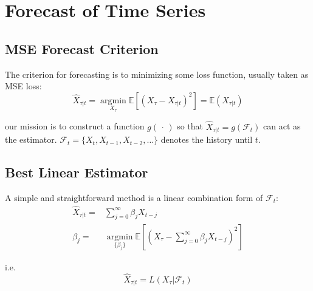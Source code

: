     


    
\section{Forecast of Time Series}


\subsection{MSE Forecast Criterion}
    The criterion for forecasting is to minimizing some loss function, usually taken as MSE loss:
    \begin{equation}
        \hat{X}_{\tau|t}= \mathop{\arg\min}\limits_{X_\tau} \mathbb{E}[\left( X_\tau-X_{\tau|t} \right)^2]= \mathbb{E}\left( X_{\tau|t} \right) 
    \end{equation}

    our mission is to construct a function $ g(\,\cdot\,) $ so that $ \hat{X}_{\tau|t}=g(\mathscr{F}_{t}) $ can act as the estimator. $ \mathscr{F}_t=\{X_t,X_{t-1},X_{t-2},\ldots\} $ denotes the history until $ t $.

\subsection{Best Linear Estimator}
    A simple and straightforward method is a linear combination form of $ \mathscr{F}_t $:
    \begin{align}
        \hat{X}_{\tau|t}=&\sum_{j=0}^\infty \beta _jX_{t-j}\\
        \beta _{j}=&\mathop{\arg\min}\limits_{\{\beta _j\}} \mathbb{E}\left[\left( X_\tau-\sum_{j=0}^\infty \beta _jX_{t-j} \right)^2\right]
    \end{align}

    i.e. 
    \begin{equation}
        \hat{X}_{\tau|t}=L(X_\tau|\mathscr{F}_t) 
    \end{equation}
    
